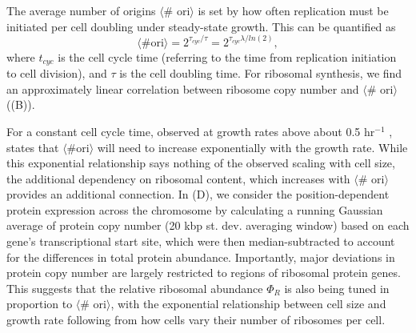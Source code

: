 The average number of origins $\langle$\# ori$\rangle$ is set by how often
replication must be initiated per cell doubling under steady-state growth.
This can be quantified as
\begin{equation}
    \langle \text{\# ori} \rangle = 2^{\tau_{cyc} / \tau} = 2^{\tau_{cyc} \lambda / ln(2)},
    \label{eq:Nori}
\end{equation}
where $t_{cyc}$ is the cell cycle time (referring to the time from replication
initiation to cell division), and $\tau$ is the cell doubling time. For
ribosomal synthesis, we find an approximately linear correlation between
ribosome copy number and $\langle$\# ori$\rangle$
((B)).

For a constant cell cycle time, observed at growth rates above about 0.5
hr$^{-1}$ \citep{helmstetter1968},  states that $\langle \text{\# ori}
\rangle$ will need to increase exponentially with the growth rate. While this
exponential relationship says nothing of the observed scaling with cell size, the
additional dependency on ribosomal content, which increases with $\langle$\#
ori$\rangle$ provides an additional connection.  In (D),
we consider the position-dependent protein expression across the chromosome by
calculating a running Gaussian average of protein copy number (20 kbp st. dev.
averaging window) based on each gene's transcriptional start site, which were
then median-subtracted to account for the differences in total protein
abundance. Importantly, major deviations in protein copy number are largely
restricted to regions of ribosomal protein genes. This suggests that the
relative ribosomal abundance $\Phi_R$ is also being tuned in proportion to
$\langle$\# ori$\rangle$, with the exponential relationship between  cell size
and growth rate following from how cells vary their number of ribosomes per
cell.


